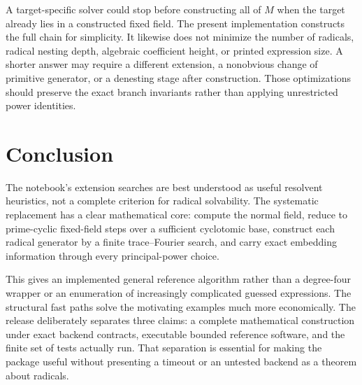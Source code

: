 \documentclass[11pt,a4paper]{article}
\theoremstyle{definition}
\begin{document}
A target-specific solver could stop before constructing all of $M$ when the
target already lies in a constructed fixed field. The present implementation
constructs the full chain for simplicity. It likewise does not minimize the
number of radicals, radical nesting depth, algebraic coefficient height, or
printed expression size. A shorter answer may require a different extension,
a nonobvious change of primitive generator, or a denesting stage after
construction. Those optimizations should preserve the exact branch invariants
rather than applying unrestricted power identities.

\section{Conclusion}
The notebook's extension searches are best understood as useful resolvent
heuristics, not a complete criterion for radical solvability. The systematic
replacement has a clear mathematical core: compute the normal field, reduce to
prime-cyclic fixed-field steps over a sufficient cyclotomic base, construct each
radical generator by a finite trace--Fourier search, and carry exact embedding
information through every principal-power choice.

This gives an implemented general reference algorithm rather than a degree-four
wrapper or an enumeration of increasingly complicated guessed expressions. The
structural fast paths solve the motivating examples much more economically.
The release deliberately separates three claims: a complete mathematical
construction under exact backend contracts, executable bounded reference
software, and the finite set of tests actually run. That separation is essential
for making the package useful without presenting a timeout or an untested
backend as a theorem about radicals.

\appendix
\end{document}
